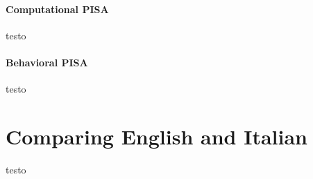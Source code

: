 \paragraph{Computational PISA} testo

\paragraph{Behavioral PISA} testo



\section{Comparing English and Italian} 

testo











